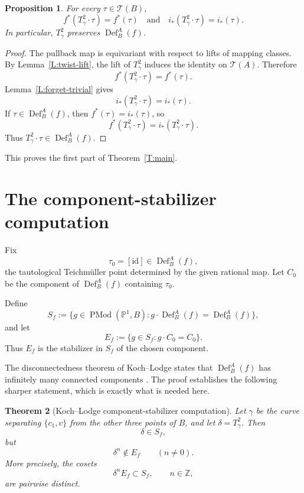 \documentclass[11pt]{article}
\newtheorem{theorem}{Theorem}[section]
\newtheorem{proposition}[theorem]{Proposition}
\theoremstyle{definition}
\theoremstyle{remark}
\newcommand{\TT}{\mathcal T}
\newcommand{\PMod}{\operatorname{PMod}}
\newcommand{\Def}{\operatorname{Def}}
\begin{document}
\begin{proposition}\label{P:stable}
For every \(\tau\in\TT(B)\),
\[
f^*(T_\gamma^2\cdot\tau)=f^*(\tau)
\quad\text{and}\quad
i_*(T_\gamma^2\cdot\tau)=i_*(\tau).
\]
In particular, \(T_\gamma^2\) preserves \(\Def_B^A(f)\).
\end{proposition}

\begin{proof}
The pullback map is equivariant with respect to lifts of mapping classes.
By Lemma~\ref{L:twist-lift}, the lift of \(T_\gamma^2\) induces the identity
on \(\TT(A)\).  Therefore
\[
f^*(T_\gamma^2\cdot\tau)=f^*(\tau).
\]
Lemma~\ref{L:forget-trivial} gives
\[
i_*(T_\gamma^2\cdot\tau)=i_*(\tau).
\]
If \(\tau\in\Def_B^A(f)\), then \(f^*(\tau)=i_*(\tau)\), so
\[
f^*(T_\gamma^2\cdot\tau)=i_*(T_\gamma^2\cdot\tau).
\]
Thus \(T_\gamma^2\cdot\tau\in\Def_B^A(f)\).
\end{proof}

This proves the first part of Theorem~\ref{T:main}.

\section{The component-stabilizer computation}

Fix
\[
\tau_0=[\mathrm{id}]\in\Def_B^A(f),
\]
the tautological Teichm\"uller point determined by the given rational map.
Let \(C_0\) be the component of \(\Def_B^A(f)\) containing \(\tau_0\).

Define
\[
S_f:=\{g\in\PMod(\mathbb P^1,B):g\cdot\Def_B^A(f)=\Def_B^A(f)\},
\]
and let
\[
E_f:=\{g\in S_f:g\cdot C_0=C_0\}.
\]
Thus \(E_f\) is the stabilizer in \(S_f\) of the chosen component.

The disconnectedness theorem of Koch--Lodge states that
\(\Def_B^A(f)\) has infinitely many connected components
\cite[Theorem~1.3]{KL-arxiv}.  The proof establishes the following sharper
statement, which is exactly what is needed here.

\begin{theorem}[Koch--Lodge component-stabilizer computation]
\label{T:KL-orbit}
Let \(\gamma\) be the curve separating \(\{c_1,v\}\) from the other three
points of \(B\), and let \(\delta=T_\gamma^2\).  Then
\[
\delta\in S_f,
\]
but
\[
\delta^n\notin E_f\qquad(n\neq0).
\]
More precisely, the cosets
\[
\delta^nE_f\subset S_f,\qquad n\in\mathbb Z,
\]
are pairwise distinct.
\end{theorem}
\end{document}

